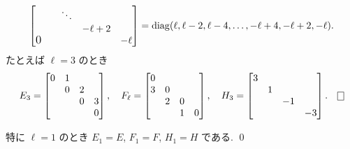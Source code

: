 \documentclass[12pt,twoside]{jarticle}
\begin{document}
\begin{question}
\begin{enumerate}
\begin{align*}
\begin{bmatrix}
             &        & \ddots & & \\
             &        &        & -\ell+2 & \\
        \smash{\hbox{\large 0}}  &  &        &         & -\ell \\
      \end{bmatrix}
      = \mathop{\mathrm{diag}}\nolimits(\ell,\ell-2,\ell-4,\ldots,-\ell+4,-\ell+2,-\ell).
    \end{align*}
    たとえば $\ell=3$ のとき
    \begin{equation*}
      E_3 =
      \begin{bmatrix}
        0 & 1 &   &   \\
          & 0 & 2 &   \\
          &   & 0 & 3 \\
          &   &   & 0 \\
      \end{bmatrix},
      \quad
      F_\ell =
      \begin{bmatrix}
        0 & & & \\
        3 & 0 & & \\
          & 2 & 0 & \\
          &   & 1 & 0 \\
      \end{bmatrix},
      \quad
      H_3 =
      \begin{bmatrix}
        3 & & & \\
          & 1 & & \\
          &   & -1 & \\
          &   &    & -3 \\
      \end{bmatrix}.
      \qed
    \end{equation*}
  \end{enumerate}
\end{question}

\begin{rem}
  特に $\ell=1$ のとき $E_1=E$, $F_1=F$, $H_1=H$ である.  \qed
\end{rem}
\end{document}
